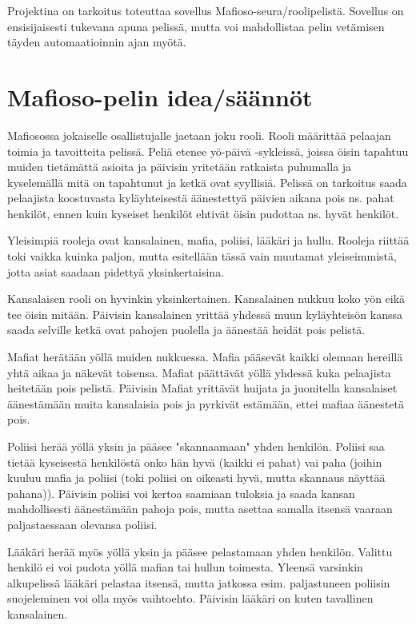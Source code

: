 Projektina on tarkoitus toteuttaa sovellus Mafioso-seura/roolipelistä. Sovellus
on ensisijaisesti tukevana apuna pelissä, mutta voi mahdollistaa pelin
vetämisen täyden automaatioinnin ajan myötä.

\section{Mafioso-pelin idea/säännöt}

Mafiosossa jokaiselle osallistujalle jaetaan joku rooli. Rooli määrittää
pelaajan toimia ja tavoitteita pelissä. Peliä etenee yö-päivä -sykleissä,
joissa öisin tapahtuu muiden tietämättä asioita ja päivisin yritetään ratkaista
puhumalla ja kyselemällä mitä on tapahtunut ja ketkä ovat syyllisiä. Pelissä on
tarkoitus saada pelaajista koostuvasta kyläyhteisestä äänestettyä päivien
aikana pois ns. pahat henkilöt, ennen kuin kyseiset henkilöt ehtivät öisin
pudottaa ns. hyvät henkilöt.

Yleisimpiä rooleja ovat kansalainen, mafia, poliisi, lääkäri ja hullu. Rooleja
riittää toki vaikka kuinka paljon, mutta esitellään tässä vain muutamat
yleiseimmistä, jotta asiat saadaan pidettyä yksinkertaisina.

Kansalaisen rooli on hyvinkin yksinkertainen. Kansalainen nukkuu koko yön eikä
tee öisin mitään. Päivisin kansalainen yrittää yhdessä muun kyläyhteisön kanssa
saada selville ketkä ovat pahojen puolella ja äänestää heidät pois pelistä.

Mafiat herätään yöllä muiden nukkuessa. Mafia pääsevät kaikki olemaan hereillä
yhtä aikaa ja näkevät toisensa. Mafiat päättävät yöllä yhdessä kuka pelaajista
heitetään pois pelistä. Päivisin Mafiat yrittävät huijata ja juonitella
kansalaiset äänestämään muita kansalaisia pois ja pyrkivät estämään, ettei
mafiaa äänestetä pois.

Poliisi herää yöllä yksin ja pääsee "skannaamaan" yhden henkilön. Poliisi saa
tietää kyseisestä henkilöstä onko hän hyvä (kaikki ei pahat) vai paha (joihin
kuuluu mafia ja poliisi (toki poliisi on oikeasti hyvä, mutta skannaus näyttää
pahana)). Päivisin poliisi voi kertoa saamiaan tuloksia ja saada kansan
mahdollisesti äänestämään pahoja pois, mutta asettaa samalla itsensä vaaraan
paljastaessaan olevansa poliisi.

Lääkäri herää myös yöllä yksin ja pääsee pelastamaan yhden henkilön. Valittu
henkilö ei voi pudota yöllä mafian tai hullun toimesta. Yleensä varsinkin
alkupelissä lääkäri pelastaa itsensä, mutta jatkossa esim. paljastuneen
poliisin suojeleminen voi olla myös vaihtoehto. Päivisin lääkäri on kuten
tavallinen kansalainen.

